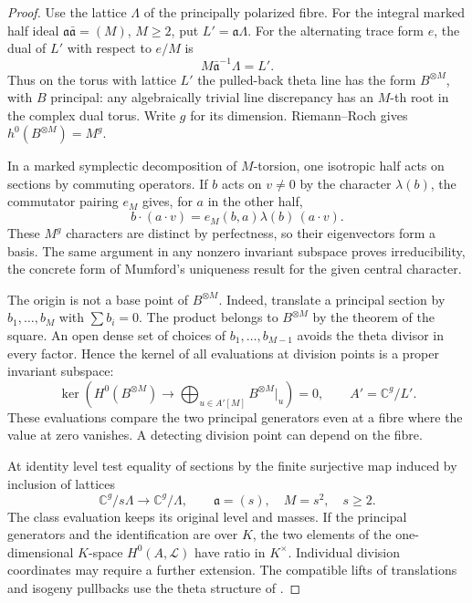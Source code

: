 \begin{proof}
Use the lattice \(\Lambda\) of the principally polarized fibre.
For the integral marked half ideal
\(\mathfrak a\bar{\mathfrak a}=(M)\),
\(M\ge2\), put \(L'=\mathfrak a\Lambda\). For the alternating
trace form \(e\), the dual of \(L'\) with respect to \(e/M\) is
\[
                     M\bar{\mathfrak a}^{-1}\Lambda=L'.
\]
Thus on the torus with lattice \(L'\) the pulled-back theta line
has the form \(B^{\otimes M}\), with \(B\) principal: any
algebraically trivial line discrepancy has an \(M\)-th root
in the complex dual torus. Write \(g\) for its dimension.
Riemann--Roch gives \(h^0(B^{\otimes M})=M^g\).

In a marked symplectic decomposition of \(M\)-torsion, one
isotropic half acts on sections by commuting operators.
If \(b\) acts on \(v\ne0\) by the character \(\lambda(b)\), the
commutator pairing \(e_M\) gives, for \(a\) in the other half,
\[
 b\cdot(a\cdot v)=e_M(b,a)\lambda(b)\,(a\cdot v).
\]
These \(M^g\) characters are distinct by perfectness, so their
eigenvectors form a basis. The same argument in any nonzero invariant
subspace proves irreducibility, the concrete form of Mumford's
uniqueness result for the given central character.
\cite[Section~1, Proposition~3]{mumford-theta-isogeny}

The origin is not a base point of \(B^{\otimes M}\). Indeed,
translate a principal section by \(b_1,\ldots,b_M\) with
\(\sum b_i=0\). The product belongs to \(B^{\otimes M}\) by the
theorem of the square. An open dense set of choices of
\(b_1,\ldots,b_{M-1}\) avoids the theta divisor in every factor.
Hence the kernel of all evaluations at division points is a
proper invariant subspace:
\[
 \ker\!\left(H^0(B^{\otimes M})\longrightarrow
       \bigoplus_{u\in A'[M]} B^{\otimes M}|_u\right)=0,
       \qquad A'=\mathbb C^g/L'.
\]
These evaluations compare the two principal generators even at a
fibre where the value at zero vanishes. A detecting division
point can depend on the fibre.

At identity level test equality of sections by the finite
surjective map induced by inclusion of lattices
\[
       \mathbb C^g/s\Lambda\longrightarrow\mathbb C^g/\Lambda,
       \qquad \mathfrak a=(s),\quad M=s^2,\quad s\ge2.
\]
The class evaluation keeps its original level and masses.
If the principal generators and
the identification are over \(K\), the two elements of the
one-dimensional \(K\)-space \(H^0(A,\mathcal L)\) have ratio in
\(K^\times\). Individual division coordinates may require a
further extension. The compatible lifts of translations and
isogeny pullbacks use the theta structure of
\cite[Section~1, Theorem~4]{mumford-theta-isogeny}.


\end{proof}
